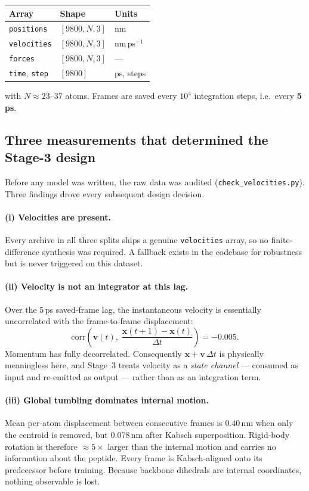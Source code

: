 \documentclass[11pt,a4paper]{article}
\begin{document}
\begin{center}
\begin{tabular}{@{}lll@{}}
\toprule
Array & Shape & Units \\
\midrule
\texttt{positions}  & $[9800, N, 3]$ & nm \\
\texttt{velocities} & $[9800, N, 3]$ & nm\,ps$^{-1}$ \\
\texttt{forces}     & $[9800, N, 3]$ & --- \\
\texttt{time}, \texttt{step} & $[9800]$ & ps, steps \\
\bottomrule
\end{tabular}
\end{center}

with $N \approx 23$--$37$ atoms. Frames are saved every $10^4$ integration
steps, i.e.\ every \textbf{5\,ps}.

\subsection{Three measurements that determined the Stage-3 design}
\label{sec:measurements}

Before any model was written, the raw data was audited
(\texttt{check\_velocities.py}). Three findings drove every subsequent design
decision.

\paragraph{(i) Velocities are present.}
Every archive in all three splits ships a genuine \texttt{velocities} array, so
no finite-difference synthesis was required. A fallback exists in the codebase
for robustness but is never triggered on this dataset.

\paragraph{(ii) Velocity is not an integrator at this lag.}
Over the 5\,ps saved-frame lag, the instantaneous velocity is essentially
uncorrelated with the frame-to-frame displacement:
\[
  \mathrm{corr}\!\left(\mathbf{v}(t),\;
  \frac{\mathbf{x}(t{+}1)-\mathbf{x}(t)}{\Delta t}\right) = -0.005 .
\]
Momentum has fully decorrelated. Consequently
$\mathbf{x} + \mathbf{v}\,\Delta t$ is physically meaningless here, and Stage~3
treats velocity as a \emph{state channel} --- consumed as input and re-emitted
as output --- rather than as an integration term.

\paragraph{(iii) Global tumbling dominates internal motion.}
Mean per-atom displacement between consecutive frames is $0.40$\,nm when only
the centroid is removed, but $0.078$\,nm after Kabsch superposition. Rigid-body
rotation is therefore $\approx 5\times$ larger than the internal motion and
carries no information about the peptide. Every frame is Kabsch-aligned onto
its predecessor before training. Because backbone dihedrals are internal
coordinates, nothing observable is lost.
\end{document}

